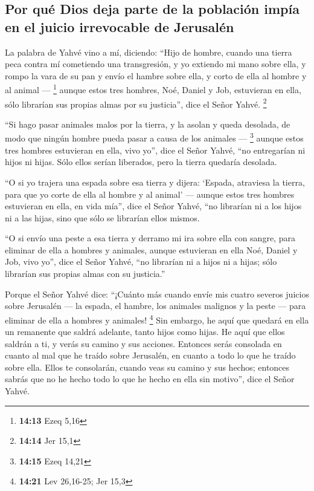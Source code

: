 \hypertarget{por-quuxe9-dios-deja-parte-de-la-poblaciuxf3n-impuxeda-en-el-juicio-irrevocable-de-jerusaluxe9n}{%
\subsection{Por qué Dios deja parte de la población impía en el juicio
irrevocable de
Jerusalén}\label{por-quuxe9-dios-deja-parte-de-la-poblaciuxf3n-impuxeda-en-el-juicio-irrevocable-de-jerusaluxe9n}}

 La palabra de Yahvé vino a mí, diciendo: 
``Hijo de hombre, cuando una tierra peca contra mí cometiendo una
transgresión, y yo extiendo mi mano sobre ella, y rompo la vara de su
pan y envío el hambre sobre ella, y corto de ella al hombre y al animal
--- \footnote{\textbf{14:13} Ezeq 5,16}  aunque estos
tres hombres, Noé, Daniel y Job, estuvieran en ella, sólo librarían sus
propias almas por su justicia'', dice el Señor Yahvé. \footnote{\textbf{14:14}
  Jer 15,1}

 ``Si hago pasar animales malos por la tierra, y la
asolan y queda desolada, de modo que ningún hombre pueda pasar a causa
de los animales --- \footnote{\textbf{14:15} Ezeq 14,21} 
aunque estos tres hombres estuvieran en ella, vivo yo'', dice el Señor
Yahvé, ``no entregarían ni hijos ni hijas. Sólo ellos serían liberados,
pero la tierra quedaría desolada.

 ``O si yo trajera una espada sobre esa tierra y dijera:
`Espada, atraviesa la tierra, para que yo corte de ella al hombre y al
animal' ---  aunque estos tres hombres estuvieran en
ella, en vida mía'', dice el Señor Yahvé, ``no librarían ni a los hijos
ni a las hijas, sino que sólo se librarían ellos mismos.

 ``O si envío una peste a esa tierra y derramo mi ira
sobre ella con sangre, para eliminar de ella a hombres y animales,
 aunque estuvieran en ella Noé, Daniel y Job, vivo yo'',
dice el Señor Yahvé, ``no librarían ni a hijos ni a hijas; sólo
librarían sus propias almas con su justicia.''

 Porque el Señor Yahvé dice: ``¡Cuánto más cuando envíe
mis cuatro severos juicios sobre Jerusalén --- la espada, el hambre, los
animales malignos y la peste --- para eliminar de ella a hombres y
animales! \footnote{\textbf{14:21} Lev 26,16-25; Jer 15,3}
 Sin embargo, he aquí que quedará en ella un remanente
que saldrá adelante, tanto hijos como hijas. He aquí que ellos saldrán a
ti, y verás su camino y sus acciones. Entonces serás consolada en cuanto
al mal que he traído sobre Jerusalén, en cuanto a todo lo que he traído
sobre ella.  Ellos te consolarán, cuando veas su camino y
sus hechos; entonces sabrás que no he hecho todo lo que he hecho en ella
sin motivo'', dice el Señor Yahvé.

